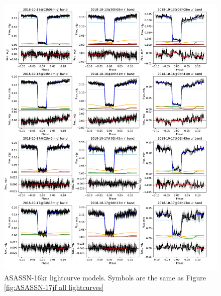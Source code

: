 \begin{figure}
    \centering
    \includegraphics[width=\columnwidth, trim={0 0cm 0 0}, clip]{figures/three_cvs_with_weird_colours/ASASSN-16kr/ASASSN-16kr_lightcurves_3.pdf}
    \caption{ASASSN-16kr lightcurve models. Symbols are the same as Figure \ref{fig:ASASSN-17jf all lightcurves}}
    \label{fig:ASASSN-16kr all lightcurves}
\end{figure}
